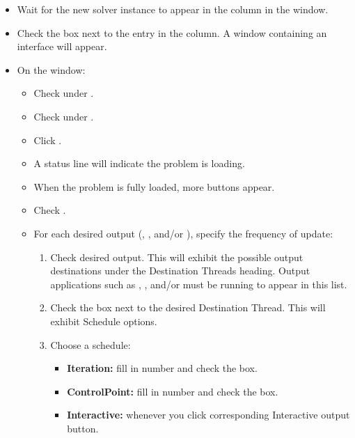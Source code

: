 \begin{list}{}{\setlength{\labelwidth}{0pt}
               \setlength{\leftmargin}{0pt}
               \setlength{\rightmargin}{\leftmargin}
               \setlength{\itemsep}{0pt}}
\begin{description}
\begin{itemize}
            button to launch an instance of the program
            .
      \item Wait for the new solver instance to appear in the 
           column in the  window.
      \item Check the box next to the  entry in the
           column.  A window containing an
           interface will appear.
      \item On the  window:
      \begin{itemize}
        \item Check  under .
        \item Check  under .
        \item Click .
        \item A status line will indicate the problem is loading.
        \item When the problem is fully loaded, more buttons appear.
        \item Check .
        \item For each desired output (, , 
          and/or ), specify the frequency of update:
        \begin{enumerate}
          \item Check desired output.  This will exhibit the possible
                output destinations under the Destination Threads
                heading.  Output applications such as ,
                , and/or  must be running
                to appear in this list.
          \item Check the box next to the desired Destination Thread.  
                This will exhibit Schedule options.
          \item Choose a schedule:
          \begin{itemize}
            \item {\bf Iteration:} fill in number and check the box.
            \item {\bf ControlPoint:} fill in number and check the box.
            \item {\bf Interactive:} whenever you click corresponding
                  Interactive output button.
          \end{itemize}

\end{enumerate}
\end{itemize}
\end{itemize}
\end{description}
\end{list}
